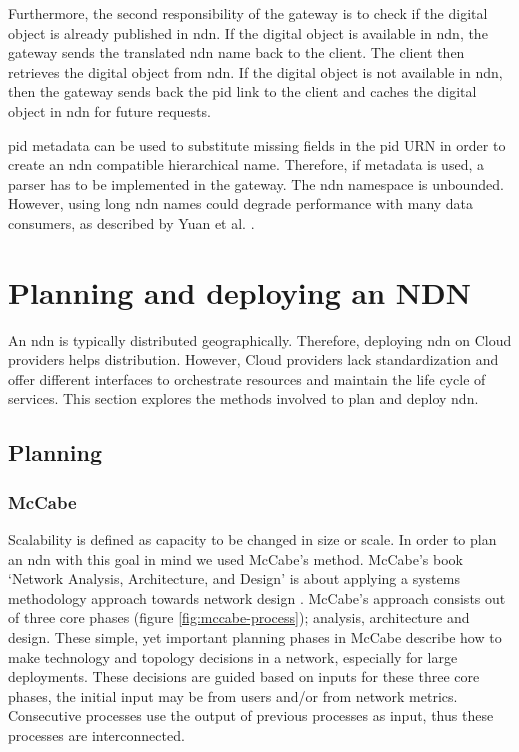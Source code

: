 \documentclass[conference]{IEEEtran}
\begin{document}
Furthermore, the second responsibility of the gateway is to check if the digital object is already published in \gls{ndn}. If the digital object is available in \gls{ndn}, the gateway sends the translated \gls{ndn} name back to the client. The client then retrieves the digital object from \gls{ndn}. If the digital object is not available in \gls{ndn}, then the gateway sends back the \gls{pid} link to the client and caches the digital object in \gls{ndn} for future requests.

\gls{pid} metadata can be used to substitute missing fields in the \gls{pid} URN in order to create an \gls{ndn} compatible hierarchical name. Therefore, if metadata is used, a parser has to be implemented in the gateway. The \gls{ndn} namespace is unbounded. However, using long \gls{ndn} names could degrade performance with many data consumers, as described by Yuan et al. \cite{yuan2012scalable}.

\section{Planning and deploying an NDN}
\label{ndn-planning-deployment}
An \gls{ndn} is typically distributed geographically. Therefore, deploying \gls{ndn} on Cloud providers helps distribution. However, Cloud providers lack standardization and offer different interfaces to orchestrate resources and maintain the life cycle of services. This section explores the methods involved to plan and deploy \gls{ndn}.

\subsection{Planning}

\subsubsection{McCabe}
Scalability is defined as capacity to be changed in size or scale. In order to plan an \gls{ndn} with this goal in mind we used McCabe's method. McCabe's book `Network Analysis, Architecture, and Design' is about applying a systems methodology approach towards network design \cite{mccabe2010network}. McCabe's approach consists out of three core phases (figure \ref{fig:mccabe-process}); analysis, architecture and design. These simple, yet important planning phases in McCabe describe how to make technology and topology decisions in a network, especially for large deployments. These decisions are guided based on inputs for these three core phases, the initial input may be from users and/or from network metrics. Consecutive processes use the output of previous processes as input, thus these processes are interconnected.
\end{document}
